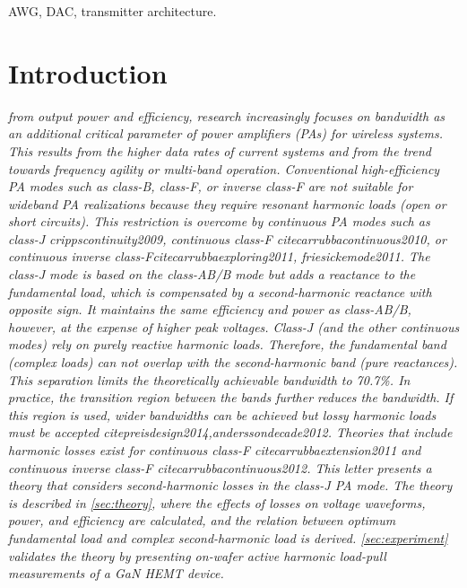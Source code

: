 \documentclass[journal]{IEEEtran}
\begin{document}
\begin{IEEEkeywords}
  AWG, DAC, transmitter architecture.
\end{IEEEkeywords}



\section{Introduction}
\label{sec:introduction}
{\itshape {} from output power and efficiency, research increasingly
focuses on bandwidth as an additional critical parameter of power amplifiers
(PAs) for wireless systems. This results from the higher data rates of current
systems and from the trend towards frequency agility or multi-band operation.
%
Conventional high-efficiency PA modes such as class-B, class-F, or inverse
class-F are not suitable for wideband PA realizations because they require
resonant harmonic loads (open or short circuits). This restriction is overcome
by continuous PA modes such as class-J crippscontinuity2009,
continuous class-F
citecarrubbacontinuous2010,
or continuous inverse class-Fcitecarrubbaexploring2011, friesickemode2011.
%
The class-J mode is based on the class-AB/B mode but adds a reactance to the
fundamental load, which is compensated by a second-harmonic reactance with
opposite sign. It maintains the same efficiency and power as class-AB/B,
however, at the expense of higher peak voltages. Class-J (and the other
continuous modes) rely on purely reactive harmonic loads. Therefore, the
fundamental band (complex loads) can not overlap with the second-harmonic band
(pure reactances). This separation limits the theoretically achievable
bandwidth to 70.7\%. In practice, the transition region between the bands
further reduces the bandwidth. If this region is used, wider bandwidths can be
achieved but lossy harmonic loads must be accepted
cite{preisdesign2014,anderssondecade2012}.
%
Theories that include harmonic losses exist for continuous class-F
cite{carrubbaextension2011}
and continuous inverse class-F
cite{carrubbacontinuous2012}.
This letter presents a theory that considers second-harmonic losses in the
class-J PA mode. The theory is described in \cref{sec:theory}, where the
effects of losses on voltage waveforms, power, and efficiency are calculated,
and the relation between optimum fundamental load and complex second-harmonic
load is derived. \cref{sec:experiment} validates the theory by presenting
on-wafer active harmonic load-pull measurements of a GaN HEMT device.}
%
%
\end{document}
